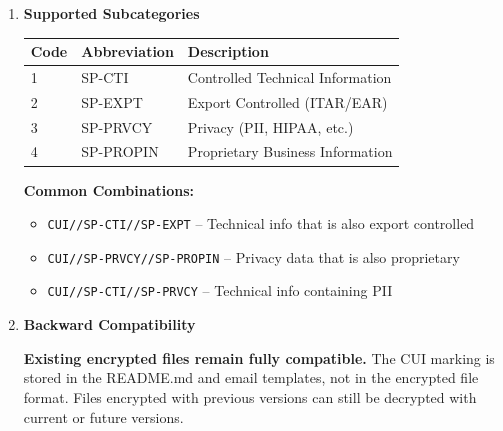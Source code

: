 \documentclass[11pt,letterpaper]{article}
\newcommand{\dmsection}[1]{\item \textbf{#1}\par}
\begin{document}
\begin{enumerate}
\textbf{User Interface:}

\begin{verbatim}
Select CUI Subcategories (can select multiple per 32 CFR Part 2002):

  [0] CUI (basic - no subcategory)
  [1] SP-CTI - Controlled Technical Information
  [2] SP-EXPT - Export Controlled
  [3] SP-PRVCY - Privacy
  [4] SP-PROPIN - Proprietary Business Information

Enter selection(s) separated by commas (e.g., '1,2' for CTI+EXPT)
Or press Enter for basic CUI

Selection: 1,2
\end{verbatim}

Result: \texttt{CUI//SP-CTI//SP-EXPT}

\dmsection{Supported Subcategories}

\begin{tabularx}{\textwidth}{|l|l|X|}
\hline
\textbf{Code} & \textbf{Abbreviation} & \textbf{Description} \\
\hline
1 & SP-CTI & Controlled Technical Information \\
\hline
2 & SP-EXPT & Export Controlled (ITAR/EAR) \\
\hline
3 & SP-PRVCY & Privacy (PII, HIPAA, etc.) \\
\hline
4 & SP-PROPIN & Proprietary Business Information \\
\hline
\end{tabularx}

\vspace{12pt}

\textbf{Common Combinations:}
\begin{itemize}
    \item \texttt{CUI//SP-CTI//SP-EXPT} -- Technical info that is also export controlled
    \item \texttt{CUI//SP-PRVCY//SP-PROPIN} -- Privacy data that is also proprietary
    \item \texttt{CUI//SP-CTI//SP-PRVCY} -- Technical info containing PII
\end{itemize}

\dmsection{Backward Compatibility}

\textbf{Existing encrypted files remain fully compatible.} The CUI marking is stored in the README.md and email templates, not in the encrypted file format. Files encrypted with previous versions can still be decrypted with current or future versions.


\end{enumerate}
\end{document}
